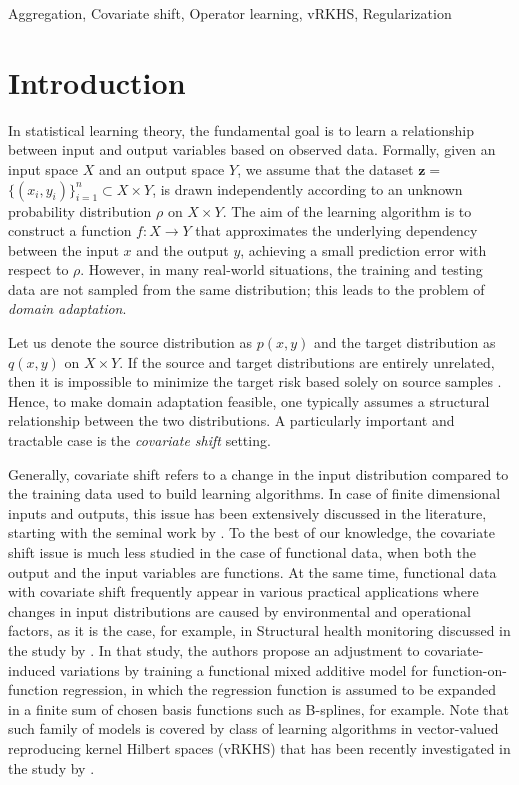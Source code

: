 \documentclass[twoside,11pt]{article}
\begin{document}
\begin{keywords}
  Aggregation, Covariate shift, Operator learning, vRKHS, Regularization

\end{keywords}


\section{Introduction}
In statistical learning theory, the fundamental goal is to learn a relationship between input and output variables based on observed data. 
Formally, given an input space $X$ and an output space $Y$, we assume that the dataset $\mathbf{z} =$ $\{(x_i, y_i)\}_{i=1}^n \subset X \times Y$, is drawn independently according to an unknown probability distribution $\rho$ on $X \times Y$. 
{The aim of the learning algorithm is to construct a function $f:X\rightarrow Y$ that approximates the underlying dependency between the input $x$ and the output $y$, achieving a small prediction error with respect to $\rho$.}
However, in many real-world situations, the training and testing data are not sampled from the same distribution; 
this leads to the problem of \emph{domain adaptation}. 

Let us denote the source distribution as  $p(x,y)$ and the target distribution as $q(x,y)$ on $X\times Y$. If the source and target distributions are entirely unrelated, then it is impossible to minimize the target risk based solely on source samples \cite{impossibility}.
Hence, to make domain adaptation feasible, one typically assumes a structural
relationship between the two distributions. A particularly important and tractable case is the
\emph{covariate shift} setting. 

\vspace{0.4em}



Generally, covariate shift refers to a change in the input distribution  compared to the training data used to build learning algorithms. In case of finite dimensional inputs and outputs, this issue has been extensively discussed in the literature, starting with the seminal work by  \cite{shimodaira2000improving}. To the best of our knowledge, the covariate shift issue is much less studied in the case of functional data, when both the output and the input variables are functions. At the same time, functional data with covariate shift frequently appear in various practical applications where changes in input distributions are caused by environmental and operational factors, as it is the case, for example, in Structural health monitoring discussed in the study by  \cite{Wittenberg_Neumann_Mendler_Gertheiss_2025}. In that study, the authors propose an adjustment to covariate-induced variations by training a functional mixed additive model for function-on-function regression,  in which the regression function is assumed to be expanded in a finite sum of chosen basis functions such as  B-splines, for example. Note that such family of models is covered by class of learning algorithms in vector-valued reproducing kernel Hilbert spaces (vRKHS) that has been recently investigated in the study by  \cite{meunier2024optimal}. 
\end{document}
